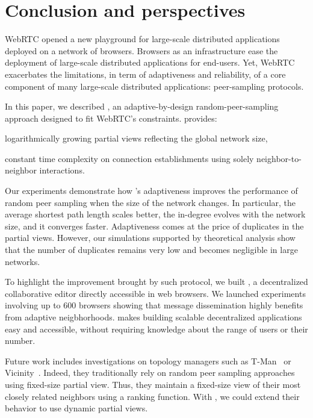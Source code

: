 
\section{Conclusion and perspectives}
\label{sec:conclusion}


WebRTC opened a new playground for large-scale distributed
applications deployed on a network of browsers. Browsers as an
infrastructure ease the deployment of large-scale distributed
applications for end-users. Yet, WebRTC exacerbates the limitations,
in term of adaptiveness and reliability, of a core component of many
large-scale distributed applications: peer-sampling protocols.

In this paper, we described \SPRAY, an adaptive-by-design
random-peer-sampling approach designed to fit WebRTC's constraints.
\SPRAY provides:
\begin{inparaenum}[(i)]
\item logarithmically growing partial views reflecting the global network size,
\item constant time complexity on connection establishments using solely
  neighbor-to-neighbor interactions.
\end{inparaenum}
Our experiments demonstrate how \SPRAY's adaptiveness improves the
performance of random peer sampling when the size of the network
changes. In particular, the average shortest path length scales
better, the in-degree evolves with the network size, and it converges
faster.  Adaptiveness comes at the price of duplicates in the partial
views. However, our simulations supported by theoretical analysis show
that the number of duplicates remains very low and becomes negligible
in large networks.

To highlight the improvement brought by such protocol, we built
\CRATE, a decentralized collaborative editor directly accessible in
web browsers. We launched experiments involving up to 600 browsers
showing that message dissemination highly benefits from adaptive
neigbhorhoods. \SPRAY makes building scalable decentralized
applications easy and accessible, without requiring knowledge about
the range of users or their number.

Future work includes investigations on topology managers such as
T-Man~\cite{jelasity2009tman} or
Vicinity~\cite{voulgaris2005epidemic}. Indeed, they traditionally rely
on random peer sampling approaches using fixed-size partial
view. Thus, they maintain a fixed-size view of their most closely
related neighbors using a ranking function. With \SPRAY, we could
extend their behavior to use dynamic partial views.

